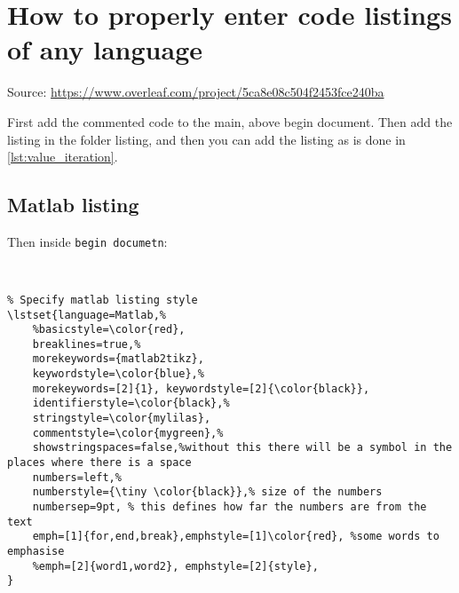 \section{How to properly enter code listings of any language}
Source: \url{https://www.overleaf.com/project/5ca8e08c504f2453fce240ba}

First add the commented code to the main, above begin document. Then add the listing in the folder listing, and then you can add the listing as is done in \cref{lst:value_iteration}.





\subsection{Matlab listing}

Then inside \verb+begin documetn+:
\begin{verbatim}


% Specify matlab listing style
\lstset{language=Matlab,%
    %basicstyle=\color{red},
    breaklines=true,%
    morekeywords={matlab2tikz},
    keywordstyle=\color{blue},%
    morekeywords=[2]{1}, keywordstyle=[2]{\color{black}},
    identifierstyle=\color{black},%
    stringstyle=\color{mylilas},
    commentstyle=\color{mygreen},%
    showstringspaces=false,%without this there will be a symbol in the places where there is a space
    numbers=left,%
    numberstyle={\tiny \color{black}},% size of the numbers
    numbersep=9pt, % this defines how far the numbers are from the text
    emph=[1]{for,end,break},emphstyle=[1]\color{red}, %some words to emphasise
    %emph=[2]{word1,word2}, emphstyle=[2]{style},    
}    
\end{verbatim}
